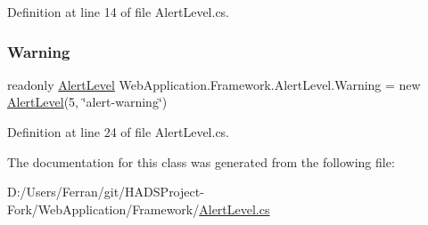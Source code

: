 Definition at line 14 of file Alert\+Level.\+cs.

\mbox{\label{classWebApplication_1_1Framework_1_1AlertLevel_a446058e14c2e46ed2ed3232cb6c6b155}} 
\subsubsection{\texorpdfstring{Warning}{Warning}}
{\footnotesize\ttfamily readonly \mbox{\hyperlink{classWebApplication_1_1Framework_1_1AlertLevel}{Alert\+Level}} Web\+Application.\+Framework.\+Alert\+Level.\+Warning = new \mbox{\hyperlink{classWebApplication_1_1Framework_1_1AlertLevel}{Alert\+Level}}(5, \char`\"{}alert-\/warning\char`\"{})\hspace{0.3cm}{\ttfamily [static]}}



Definition at line 24 of file Alert\+Level.\+cs.



The documentation for this class was generated from the following file\+:\begin{DoxyCompactItemize}
\item 
D\+:/\+Users/\+Ferran/git/\+H\+A\+D\+S\+Project-\/\+Fork/\+Web\+Application/\+Framework/\mbox{\hyperlink{AlertLevel_8cs}{Alert\+Level.\+cs}}\end{DoxyCompactItemize}
